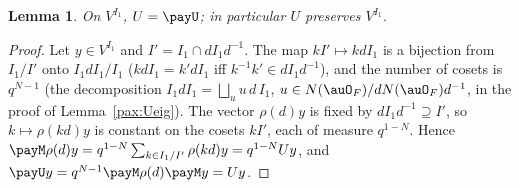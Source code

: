 \documentclass[10pt]{amsart}
\newtheorem{lemma}[theorem]{Lemma}
\theoremstyle{definition}
\theoremstyle{remark}
\begin{document}
\begin{lemma}\label{pay:UU}
On $V^{I_1}$, $U=\payU$; in particular $U$ preserves $V^{I_1}$.
\end{lemma}
\begin{proof}
Let $y\in V^{I_1}$ and $I'=I_1\cap dI_1d^{-1}$. The map $kI'\mapsto kdI_1$ is a bijection from
$I_1/I'$ onto $I_1dI_1/I_1$ ($kdI_1=k'dI_1$ iff $k^{-1}k'\in dI_1d^{-1}$), and the number of cosets is
$q^{N-1}$ (the decomposition $I_1dI_1=\bigsqcup_{u}u\,d\,I_1$, $u\in N(\auO_F)/dN(\auO_F)d^{-1}$, in
the proof of Lemma~\ref{pax:Ueig}). The vector $\rho(d)y$ is fixed by $dI_1d^{-1}\supseteq I'$, so
$k\mapsto\rho(kd)y$ is constant on the cosets $kI'$, each of measure $q^{1-N}$. Hence $\payM\rho(d)y=
q^{1-N}\sum_{k\in I_1/I'}\rho(kd)y=q^{1-N}Uy$, and $\payU y=q^{N-1}\payM\rho(d)\payM y=Uy$.
\end{proof}
\end{document}
